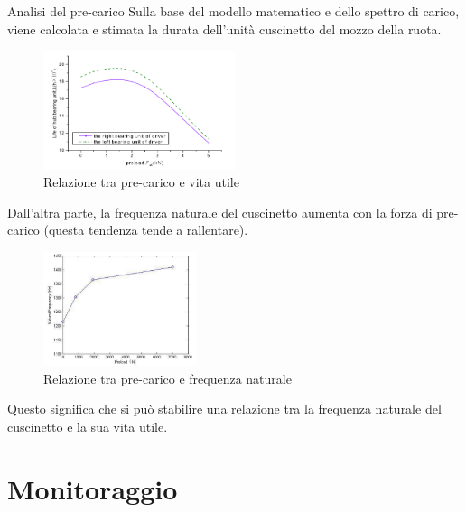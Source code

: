 \documentclass{beamer}
\begin{document}
\begin{frame}[allowframebreaks]{Analisi del pre-carico}
    Sulla base del modello matematico e dello spettro di carico, viene calcolata e stimata la durata dell'unità cuscinetto del mozzo della ruota\cite{niu2014life}.

    \begin{figure}
        \centering
        \includegraphics[width=0.5\textwidth]{Figures/Preload_Life_Estimation.png}
        \caption{Relazione tra pre-carico e vita utile}
        \label{fig:Preload_Life_Curve}
    \end{figure}
    
    Dall'altra parte, la frequenza naturale del cuscinetto aumenta con la forza di pre-carico (questa tendenza tende a rallentare).

    \begin{figure}
        \centering
        \includegraphics[width=0.4\textwidth]{Figures/Preload_NatFreq.png}
        \caption{Relazione tra pre-carico e frequenza naturale}
        \label{fig:Preload_Freq}
    \end{figure}

    Questo significa che si può stabilire una relazione tra la frequenza naturale del cuscinetto e la sua vita utile.
\end{frame}

\section{Monitoraggio}
\end{document}
